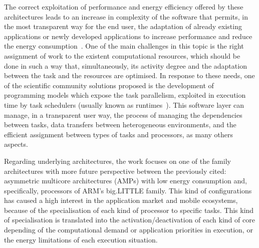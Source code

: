 The correct exploitation of performance and energy efficiency offered by
these architectures leads to an increase in complexity of the software that
permits, in the most transparent way for the end user, the adaptation of
already existing applications or newly developed applications to increase
performance and reduce the energy consumption~\cite{OsTo10, SKC+15}. One of
the main challenges in this topic is the right assignment of work to the
existent computational resources, which should be done in such a way that,
simultaneously, its activity degree and the adaptation between the task and
the resources are optimised. In response to these needs, one of the
scientific community solutions proposed is the development of programming
models which expose the task parallelism, exploited in execution
time by task schedulers (usually known as runtimes~\cite{VMC+14}).  This
software layer can manage, in a transparent user way, the process of
managing the dependencies between tasks, data transfers between
heterogeneous environments, and the efficient assignment between types of
tasks and processors, as many others aspects.


Regarding underlying architectures, the work focuses on one of the family
architectures with more future perspective between the previously cited:
asymmetric multicore architectures (AMPs) with low energy consumption and,
specifically, processors of ARM's big.LITTLE family. This kind of
configurations has caused a high interest in the application market and
mobile ecosystems, because of the specialisation of each kind of processor
to specific tasks. This kind of specialisation is translated into the
activation/deactivation of each kind of core depending of the computational
demand or application priorities in execution, or the energy limitations of
each execution situation. 

